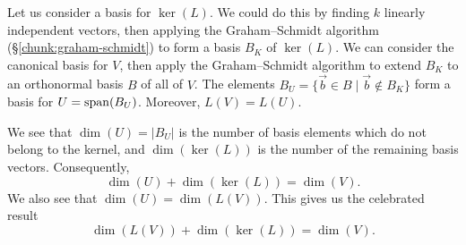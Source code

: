 Let us consider a basis for $\ker(L)$. We could do this by finding $k$
linearly independent vectors, then applying the Graham--Schmidt
algorithm (\S\ref{chunk:graham-schmidt}) to form a basis $B_{K}$ of
$\ker(L)$. We can consider the canonical basis for $V$, then apply the
Graham--Schmidt algorithm to extend $B_{K}$ to an orthonormal basis $B$ of
all of $V$. The elements $B_{U}=\{\vec{b}\in B\mid\vec{b}\notin B_{K}\}$
form a basis for $U=\operatorname{span}(B_{U})$. Moreover, $L(V)=L(U)$.

We see that $\dim(U)=|B_{U}|$ is the number of basis elements which do
not belong to the kernel, and $\dim(\ker(L))$ is the number of the
remaining basis vectors. Consequently,
\begin{equation}
\dim(U) + \dim(\ker(L)) = \dim(V).
\end{equation}
We also see that $\dim(U)=\dim(L(V))$. This gives us the celebrated
result
\begin{equation}
\boxed{\dim(L(V)) + \dim(\ker(L)) = \dim(V).}
\end{equation}
